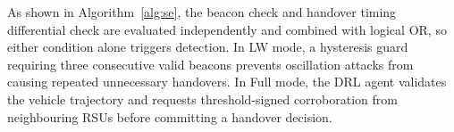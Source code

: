 As shown in Algorithm~\ref{alg:se}, the beacon check and
handover timing differential check are evaluated
independently and combined with logical OR, so either
condition alone triggers detection. In LW mode, a
hysteresis guard requiring three consecutive valid beacons
prevents oscillation attacks from causing repeated
unnecessary handovers. In Full mode, the DRL agent
validates the vehicle trajectory and requests
threshold-signed corroboration from neighbouring RSUs
before committing a handover decision.

